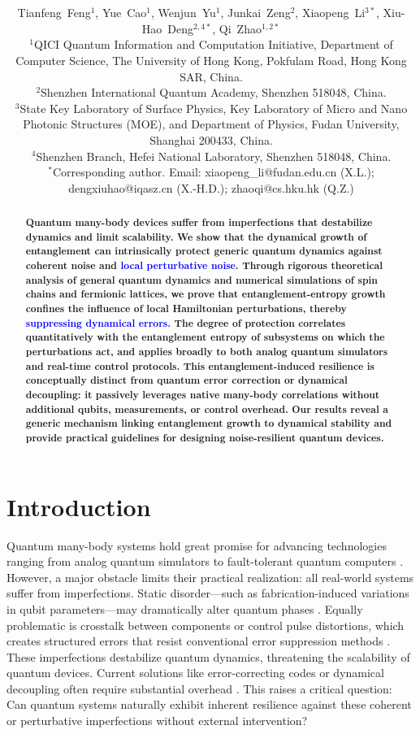 \documentclass[12pt]{article}
\title{\bfseries \boldmath \scititle}
\author{\parbox{0.95\textwidth}{\centering
Tianfeng~Feng$^{1}$,
Yue~Cao$^{1}$,
Wenjun~Yu$^{1}$,
Junkai~Zeng$^{2}$,
Xiaopeng~Li$^{3\ast}$,
Xiu-Hao~Deng$^{2,4\ast}$,
Qi~Zhao$^{1,2\ast}$\\[1ex]
\small$^{1}$QICI Quantum Information and Computation Initiative, Department of Computer Science, The University of Hong Kong, Pokfulam Road, Hong Kong SAR, China.\\
\small$^{2}$Shenzhen International Quantum Academy, Shenzhen 518048, China.\\
\small$^{3}$State Key Laboratory of Surface Physics, Key Laboratory of Micro and Nano Photonic Structures (MOE), and Department of Physics, Fudan University, Shanghai 200433, China.\\
\small$^{4}$Shenzhen Branch, Hefei National Laboratory, Shenzhen 518048, China.\\
\small$^\ast$Corresponding author. Email: xiaopeng\_li@fudan.edu.cn (X.L.); dengxiuhao@iqasz.cn (X.-H.D.); zhaoqi@cs.hku.hk (Q.Z.)
}}
\date{}
\begin{document}
\maketitle

\begin{abstract}
\bfseries \boldmath
Quantum many-body devices suffer from imperfections that destabilize dynamics and limit scalability. We show that the dynamical growth of entanglement can intrinsically protect generic quantum dynamics against coherent noise and \textcolor{blue}{local perturbative noise}. Through rigorous theoretical analysis of general quantum dynamics and numerical simulations of spin chains and fermionic lattices, we prove that entanglement-entropy growth confines the influence of local Hamiltonian perturbations, thereby \textcolor{blue}{suppressing dynamical errors}. The degree of protection correlates quantitatively with the entanglement entropy of subsystems on which the perturbations act, and applies broadly to both analog quantum simulators and real-time control protocols. This entanglement-induced resilience is conceptually distinct from quantum error correction or dynamical decoupling: it passively leverages native many-body correlations without additional qubits, measurements, or control overhead. Our results reveal a generic mechanism linking entanglement growth to dynamical stability and provide practical guidelines for designing noise-resilient quantum devices.

\end{abstract}



\section*{Introduction}
\noindent Quantum many-body systems hold great promise for advancing technologies ranging from analog quantum simulators to fault-tolerant quantum computers \cite{RevModPhys.86.153Nori,preskill2012quantumcomputingentanglementfrontier,buluta2009quantum, QECPhysRevA.57.127}. However, a major obstacle limits their practical realization: all real-world systems suffer from imperfections. Static disorder---such as fabrication-induced variations in qubit parameters---may dramatically alter quantum phases  \cite{MBLRevModPhys.91.021001,AndersonPhysRev.109.1492,heyl2018dynamical,wang2015fidelity}. Equally problematic is crosstalk between components or control pulse distortions, which creates structured errors that resist conventional error suppression methods \cite{ crosstalkPRXQuantum.3.020301, doria2011optimal,altafini2012modeling, schwenk2017estimating}. These imperfections destabilize quantum dynamics, threatening the scalability of quantum devices. Current solutions like error-correcting codes or dynamical decoupling often require substantial overhead \cite{fukui2018high,decouplingPhysRevLett.82.2417,PhysRevX.6.041034}. 
This raises a critical question: Can quantum systems naturally exhibit inherent resilience against these coherent or perturbative imperfections without external intervention?
\end{document}
